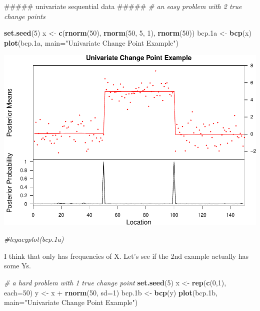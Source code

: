 \documentclass[]{article}
\newenvironment{Shaded}{\begin{snugshade}}{\end{snugshade}}
\newcommand{\KeywordTok}[1]{\textcolor[rgb]{0.13,0.29,0.53}{\textbf{{#1}}}}
\newcommand{\DataTypeTok}[1]{\textcolor[rgb]{0.13,0.29,0.53}{{#1}}}
\newcommand{\DecValTok}[1]{\textcolor[rgb]{0.00,0.00,0.81}{{#1}}}
\newcommand{\StringTok}[1]{\textcolor[rgb]{0.31,0.60,0.02}{{#1}}}
\newcommand{\CommentTok}[1]{\textcolor[rgb]{0.56,0.35,0.01}{\textit{{#1}}}}
\newcommand{\NormalTok}[1]{{#1}}
\begin{document}
\begin{Shaded}
\begin{Highlighting}[]
\NormalTok{##### univariate sequential data #####}
\CommentTok{# an easy problem with 2 true change points}

\KeywordTok{set.seed}\NormalTok{(}\DecValTok{5}\NormalTok{)}
\NormalTok{x <-}\StringTok{ }\KeywordTok{c}\NormalTok{(}\KeywordTok{rnorm}\NormalTok{(}\DecValTok{50}\NormalTok{), }\KeywordTok{rnorm}\NormalTok{(}\DecValTok{50}\NormalTok{, }\DecValTok{5}\NormalTok{, }\DecValTok{1}\NormalTok{), }\KeywordTok{rnorm}\NormalTok{(}\DecValTok{50}\NormalTok{))}
\NormalTok{bcp.1a <-}\StringTok{ }\KeywordTok{bcp}\NormalTok{(x)}
\KeywordTok{plot}\NormalTok{(bcp.1a, }\DataTypeTok{main=}\StringTok{"Univariate Change Point Example"}\NormalTok{)}
\end{Highlighting}
\end{Shaded}

\includegraphics{rentersAndOwners_files/figure-latex/unnamed-chunk-5-1.pdf}

\begin{Shaded}
\begin{Highlighting}[]
\CommentTok{#legacyplot(bcp.1a)}
\end{Highlighting}
\end{Shaded}

I think that only has frequencies of X. Let's see if the 2nd example
actually has some Ys.

\begin{Shaded}
\begin{Highlighting}[]
\CommentTok{# a hard problem with 1 true change point}
\KeywordTok{set.seed}\NormalTok{(}\DecValTok{5}\NormalTok{)}
\NormalTok{x <-}\StringTok{ }\KeywordTok{rep}\NormalTok{(}\KeywordTok{c}\NormalTok{(}\DecValTok{0}\NormalTok{,}\DecValTok{1}\NormalTok{), }\DataTypeTok{each=}\DecValTok{50}\NormalTok{)}
\NormalTok{y <-}\StringTok{ }\NormalTok{x +}\StringTok{ }\KeywordTok{rnorm}\NormalTok{(}\DecValTok{50}\NormalTok{, }\DataTypeTok{sd=}\DecValTok{1}\NormalTok{)}
\NormalTok{bcp.1b <-}\StringTok{ }\KeywordTok{bcp}\NormalTok{(y)}
\KeywordTok{plot}\NormalTok{(bcp.1b, }\DataTypeTok{main=}\StringTok{"Univariate Change Point Example"}\NormalTok{)}
\end{Highlighting}
\end{Shaded}
\end{document}
